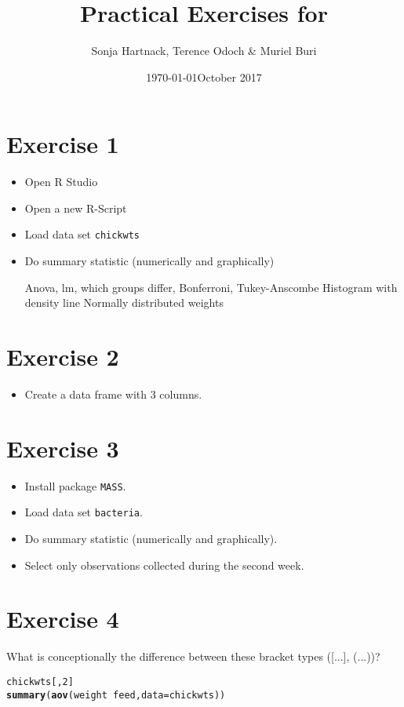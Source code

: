 \documentclass[11pt]{article}\usepackage[]{graphicx}\usepackage[]{color}
\author{Sonja Hartnack, Terence Odoch \& Muriel Buri}
\date{\today}
\title{\vspace{-3ex}Practical Exercises for \textbf{\exercisetopic}}
\date{October 2017}
\makeatletter
\newcommand{\hlnum}[1]{\textcolor[rgb]{0.686,0.059,0.569}{#1}}%
\newcommand{\hlopt}[1]{\textcolor[rgb]{0,0,0}{#1}}%
\newcommand{\hlstd}[1]{\textcolor[rgb]{0.345,0.345,0.345}{#1}}%
\newcommand{\hlkwc}[1]{\textcolor[rgb]{0.333,0.667,0.333}{#1}}%
\newcommand{\hlkwd}[1]{\textcolor[rgb]{0.737,0.353,0.396}{\textbf{#1}}}%
\newenvironment{kframe}{%
 \def\at@end@of@kframe{}%
 \ifinner\ifhmode%
  \def\at@end@of@kframe{\end{minipage}}%
  \begin{minipage}{\columnwidth}%
 \fi\fi%
 \def\FrameCommand##1{\hskip\@totalleftmargin \hskip-\fboxsep
 \colorbox{shadecolor}{##1}\hskip-\fboxsep
     \hskip-\linewidth \hskip-\@totalleftmargin \hskip\columnwidth}%
 \MakeFramed {\advance\hsize-\width
   \@totalleftmargin\z@ \linewidth\hsize
   \@setminipage}}%
 {\par\unskip\endMakeFramed%
 \at@end@of@kframe}
\newenvironment{knitrout}{}{} %
\makeatother
\begin{document}
\maketitle
\thispagestyle{fancy}

\section*{Exercise 1}
\begin{itemize}
\item Open R Studio
\item Open a new R-Script
\item Load data set \texttt{chickwts}

%
\item Do summary statistic (numerically and graphically)

Anova, lm, which groups differ, Bonferroni, Tukey-Anscombe
Histogram with density line
Normally distributed weights
\end{itemize}
%
\section*{Exercise 2}
\begin{itemize}
\item Create a data frame with 3 columns.

\end{itemize}
%
\section*{Exercise 3}
\begin{itemize}
\item Install package \texttt{MASS}.

%
\item Load data set \texttt{bacteria}.

%
\item Do summary statistic (numerically and graphically).

%
\item Select only observations collected during the second week.

\end{itemize}
%
\section*{Exercise 4}
What is conceptionally the difference between these bracket types ([...], (...))?
\begin{knitrout}\scriptsize
{}\color{fgcolor}\begin{kframe}
\begin{alltt}
\hlstd{chickwts[,} \hlnum{2}\hlstd{]}
\hlkwd{summary}\hlstd{(}\hlkwd{aov}\hlstd{(weight} \hlopt{~} \hlstd{feed,} \hlkwc{data} \hlstd{= chickwts))}
\end{alltt}
\end{kframe}
\end{knitrout}
%
\end{document}
